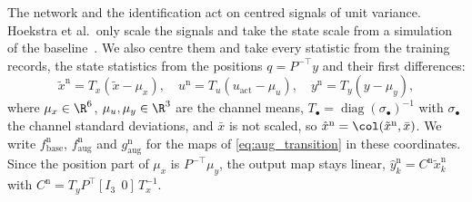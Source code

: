 The network and the identification act on centred signals of unit variance.
Hoekstra et al.\ only scale the signals and take the state scale from a
simulation of the baseline~\cite[Sec.~5.3]{hoekstra2026lfr}.
We also centre them and take every statistic from the training records, the
state statistics from the positions $q=P^{-\top}y$ and their first
differences:
\begin{equation}
 \tilde x^{\mathrm n}=T_x(\tilde x-\mu_x),\quad
 u^{\mathrm n}=T_u(u_{\mathrm{act}}-\mu_u),\quad
 y^{\mathrm n}=T_y(y-\mu_y),
 \label{eq:aug_norm}
\end{equation}
where $\mu_x\in\R^6$, $\mu_u,\mu_y\in\R^3$ are the channel means,
$T_\bullet=\operatorname{diag}(\sigma_\bullet)^{-1}$ with $\sigma_\bullet$ the
channel standard deviations, and $\bar x$ is not scaled, so
$\hat x^{\mathrm n}=\col(\tilde x^{\mathrm n},\bar x)$.
We write $f^{\mathrm n}_{\mathrm{base}}$, $f^{\mathrm n}_{\mathrm{aug}}$ and
$g^{\mathrm n}_{\mathrm{aug}}$ for the maps of \eqref{eq:aug_transition} in
these coordinates.
Since the position part of $\mu_x$ is $P^{-\top}\mu_y$, the output map stays
linear,
$\hat y^{\mathrm n}_k=C^{\mathrm n}\tilde x^{\mathrm n}_k$ with
$C^{\mathrm n}=T_yP^\top[I_3\;\,0]\,T_x^{-1}$.


